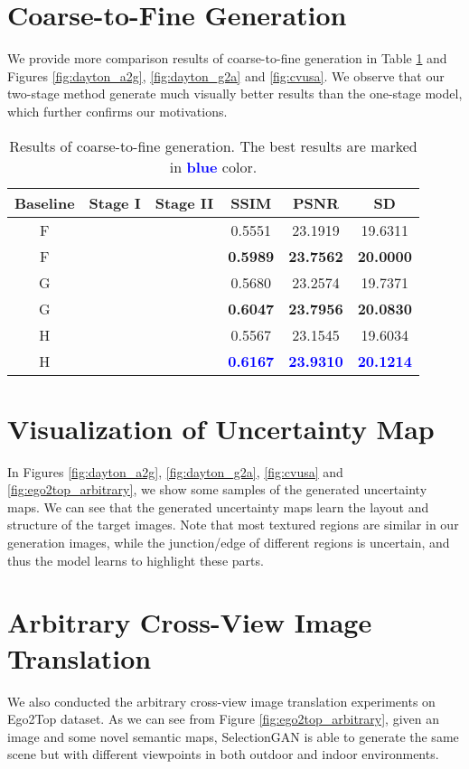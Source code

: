 \documentclass[10pt,twocolumn,letterpaper]{article}
\newcommand{\red}[1]{\textcolor{blue}{#1}}
\begin{document}
\section{Coarse-to-Fine Generation}
\label{supp:2}
We provide more comparison results of coarse-to-fine generation in Table \ref{tab:cos} and Figures \ref{fig:dayton_a2g}, \ref{fig:dayton_g2a} and \ref{fig:cvusa}.
We observe that our two-stage method generate much visually better results than the one-stage model, which further confirms our motivations.

\begin{table}[!t] \small
	\centering
	\caption{Results of coarse-to-fine generation. The best results are marked in \red{\textbf{blue}} color.} 
	\begin{tabular}{c|c|c|c|c|c} \toprule
		Baseline  & Stage I    & Stage II & SSIM    & PSNR    & SD           \\	\hline	F             &   &             & 0.5551  & 23.1919  & 19.6311  \\
		F             &               &  & \textbf{0.5989} & \textbf{23.7562} & \textbf{20.0000}  \\ \hline
		G             &   &            &  0.5680   & 23.2574 & 19.7371  \\
		G             &               &  & \textbf{0.6047}  & \textbf{23.7956} & \textbf{20.0830} \\ \hline
		H            &   &            &  0.5567 & 23.1545 & 19.6034    \\
		H            &               &  &  \textbf{\red{0.6167}} & \textbf{\red{23.9310}} & \textbf{\red{20.1214}}    \\ 
		\bottomrule		
	\end{tabular}
	\label{tab:cos}
\end{table}

\section{Visualization of Uncertainty Map}
\label{supp:3}
In Figures \ref{fig:dayton_a2g}, \ref{fig:dayton_g2a}, \ref{fig:cvusa} and  \ref{fig:ego2top_arbitrary}, we show some samples of the generated uncertainty maps.
We can see that the generated uncertainty maps learn the layout and structure of the target images.
Note that most textured regions are similar in our generation images, while the junction/edge of different regions is uncertain, and thus the model learns to highlight these parts.

\section{Arbitrary Cross-View Image Translation}
\label{supp:4}
We also conducted the arbitrary cross-view image translation experiments on Ego2Top dataset. As we can see from Figure \ref{fig:ego2top_arbitrary}, given an image and some novel semantic maps, SelectionGAN is able to generate the same scene but with different viewpoints in both outdoor and indoor environments.
\end{document}
